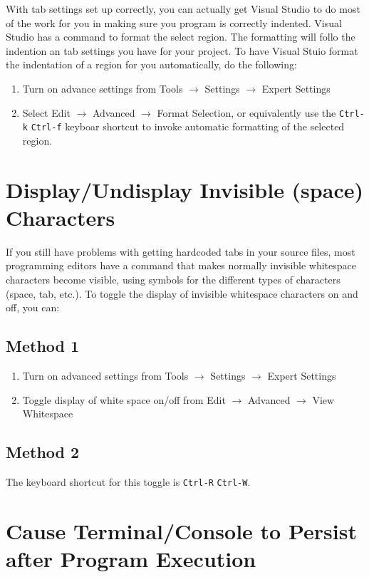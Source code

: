 \documentclass[11pt]{article}
\begin{document}
With tab settings set up correctly, you can actually get Visual Studio
to do most of the work for you in making sure you program is correctly
indented.  Visual Studio has a command to format the select region.
The formatting will follo the indention an tab settings you have for
your project.  To have Visual Stuio format the indentation of a region
for you automatically, do the following:

\begin{enumerate}
\item Turn on advance settings from Tools $\rightarrow$ Settings
   $\rightarrow$ Expert Settings
\item Select Edit $\rightarrow$ Advanced $\rightarrow$ Format Selection,
   or equivalently use the \verb~Ctrl-k~ \verb~Ctrl-f~ keyboar shortcut to
   invoke automatic formatting of the selected region.
\end{enumerate}
\section{Display/Undisplay Invisible (space) Characters}
\label{sec-4}

If you still have problems with getting hardcoded tabs in your source
files, most programming editors have a command that makes normally
invisible whitespace characters become visible, using symbols for the
different types of characters (space, tab, etc.).  To toggle the
display of invisible whitespace characters on and off, you can:
\subsection{Method 1}
\label{sec-4-1}

\begin{enumerate}
\item Turn on advanced settings from Tools $\rightarrow$ Settings $\rightarrow$ Expert Settings
\item Toggle display of white space on/off from Edit $\rightarrow$ Advanced $\rightarrow$ View Whitespace
\end{enumerate}
\subsection{Method 2}
\label{sec-4-2}

The keyboard shortcut for this toggle is \verb~Ctrl-R~ \verb~Ctrl-W~.
\section{Cause Terminal/Console to Persist after Program Execution}
\label{sec-5}
\end{document}
